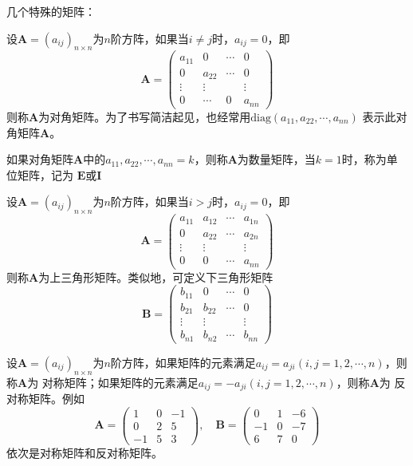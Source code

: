 \begin{remark}[]
    几个特殊的矩阵：
    
    设$\boldsymbol{A}=(a_{ij})_{n\times n}$为$n$阶方阵，如果当$i\neq j$时，$a_{ij}=0$，即
    $$
    \boldsymbol{A}=\left(\begin{array}{cccc}
    a_{11} & 0 & \cdots & 0 \\
    0 & a_{22} & \cdots & 0 \\
    \vdots & \vdots & & \vdots \\
    0 & \cdots & 0 & a_{n n}
    \end{array}\right)
    $$
    则称$\boldsymbol{A}$为{\heiti 对角矩阵}。为了书写简洁起见，也经常用$\mathrm{diag}(a_{11},a_{22},\cdots,a_{nn})$
    表示此对角矩阵$\boldsymbol{A}$。

    如果对角矩阵$\boldsymbol{A}$中的$a_{11},a_{22},\cdots,a_{nn}=k$，则称$\boldsymbol{A}$为{\heiti 数量矩阵}，当$k=1$时，称为{\heiti 单位矩阵}，记为
    $\boldsymbol{E}$或$\boldsymbol{I}$

    设$\boldsymbol{A}=(a_{ij})_{n\times n}$为$n$阶方阵，如果当$i>j$时，$a_{ij}=0$，即
    $$
    \boldsymbol{A}=\left(\begin{array}{cccc}
    a_{11} & a_{12} & \cdots & a_{1 n} \\
    0 & a_{22} & \cdots & a_{2 n} \\
    \vdots & \vdots & & \vdots \\
    0 & 0 & \cdots & a_{n n}
    \end{array}\right)
    $$
    则称$\boldsymbol{A}$为{\heiti 上三角形矩阵}。类似地，可定义{\heiti 下三角形矩阵}
    $$
    \boldsymbol{B}=\left(\begin{array}{cccc}
    b_{11} & 0 & \cdots & 0 \\
    b_{21} & b_{22} & \cdots & 0\\
    \vdots & \vdots & & \vdots \\
    b_{n1} & b_{n2} & \cdots & b_{n n}
    \end{array}\right)
    $$

    设$\boldsymbol{A}=(a_{ij})_{n\times n}$为$n$阶方阵，如果矩阵的元素满足$a_{ij}=a_{ji}(i,j=1,2,\cdots,n)$，则称$\boldsymbol{A}$为
    {\heiti 对称矩阵}；如果矩阵的元素满足$a_{ij}=-a_{ji}(i,j=1,2,\cdots,n)$，则称$\boldsymbol{A}$为
    {\heiti 反对称矩阵}。例如
    $$
    \boldsymbol{A}=\left(\begin{array}{ccc}
    1 & 0 & -1 \\
    0 & 2 & 5 \\
    -1 & 5 & 3
    \end{array}\right), \quad \boldsymbol{B}=\left(\begin{array}{ccc}
    0 & 1 & -6 \\
    -1 & 0 & -7 \\
    6 & 7 & 0
    \end{array}\right)
    $$
    依次是对称矩阵和反对称矩阵。
\end{remark}

